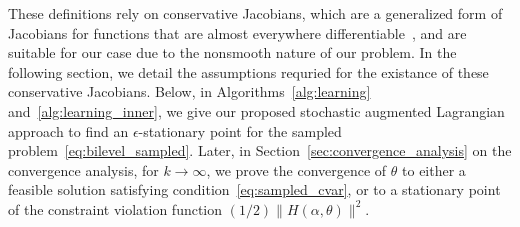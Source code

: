 \documentclass[11pt]{article}
\begin{document}
These definitions rely on conservative Jacobians, which are a generalized form of Jacobians for functions that are almost everywhere differentiable~\citep{conservative}, and are suitable for our case due to the nonsmooth nature of our problem. In the following section, we detail the assumptions requried for the existance of these conservative Jacobians. Below, in Algorithms~\ref{alg:learning} and~\ref{alg:learning_inner}, we give our proposed stochastic augmented Lagrangian approach to find an $\epsilon$-stationary point for the sampled problem~\eqref{eq:bilevel_sampled}. 
Later, in Section~\ref{sec:convergence_analysis} on the convergence analysis, for $k \rightarrow \infty$, we prove the convergence of $\theta$ to either a feasible solution satisfying condition~\eqref{eq:sampled_cvar}, or to a stationary point of the constraint violation function $(1/2)\|H(\alpha,\theta)\|^2$.
\end{document}
